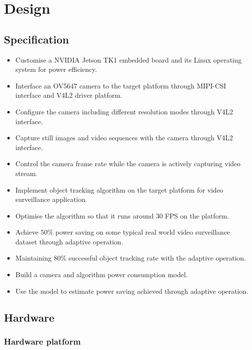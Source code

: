 \chapter{Design} \label{Chapter:Design}

\section{Specification}


\begin{itemize}
	\item Customise a NVIDIA Jetson TK1 embedded board and its Linux operating system for power efficiency.
	\item Interface an OV5647 camera to the target platform through MIPI-CSI interface and V4L2 driver platform.
	\item Configure the camera including different resolution modes through V4L2 interface.
	\item Capture still images and video sequences with the camera through V4L2 interface.
	\item Control the camera frame rate while the camera is actively capturing video stream.
	\item Implement object tracking algorithm on the target platform for video surveillance application.
	\item Optimise the algorithm so that it runs around $30$ FPS on the platform.
	\item Achieve $50\%$ power saving on some typical real world video surveillance dataset through adaptive operation.
	\item Maintaining $80\%$ successful object tracking rate with the adaptive operation.
	\item Build a camera and algorithm power consumption model.
	\item Use the model to estimate power saving achieved through adaptive operation.
\end{itemize}

\section{Hardware}


\subsection{Hardware platform}

